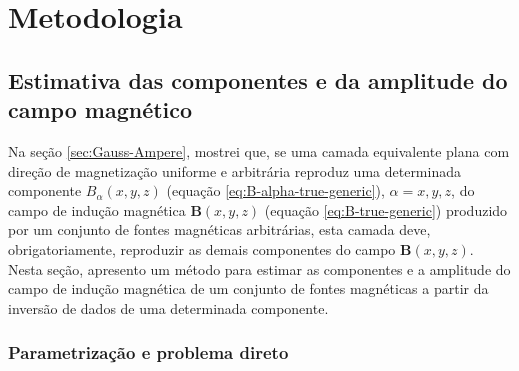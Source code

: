 \chapter{Metodologia}
\label{chap:metodologia}

\section{Estimativa das componentes e da amplitude do campo magnético}
\label{sec:componentes_campo}

Na seção \ref{sec:Gauss-Ampere}, mostrei que, se uma camada equivalente plana 
com direção de magnetização uniforme e arbitrária 
reproduz uma determinada componente $B_{\alpha}(x, y, z)$ (equação \ref{eq:B-alpha-true-generic}),
$\alpha = x, y, z$, do campo de indução magnética $\mathbf{B}(x, y, z)$ (equação \ref{eq:B-true-generic}) 
produzido por um conjunto de fontes magnéticas arbitrárias, esta camada deve, 
obrigatoriamente, reproduzir as demais componentes do campo $\mathbf{B}(x, y, z)$.
Nesta seção, apresento um método para estimar as componentes e a amplitude do campo de indução 
magnética de um conjunto de fontes magnéticas a partir da inversão de dados de uma determinada 
componente.

\subsection{Parametrização e problema direto}
\label{subsec:balpha_prob_dir}

